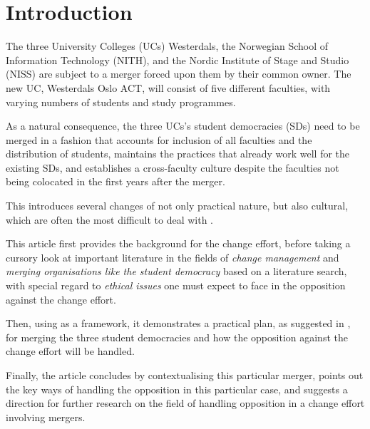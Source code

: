 \section{Introduction}

The three University Colleges (UCs) Westerdals, the Norwegian School of Information Technology (NITH), and the Nordic Institute of Stage and Studio (NISS) are subject to a merger forced upon them by their common owner. The new UC, Westerdals Oslo ACT, will consist of five different faculties, with varying numbers of students and study programmes.

As a natural consequence, the three UCs's student democracies (SDs) need to be merged in a fashion that accounts for inclusion of all faculties and the distribution of students, maintains the practices that already work well for the existing SDs, and establishes a cross-faculty culture despite the faculties not being colocated in the first years after the merger.

This introduces several changes of not only practical nature, but also cultural, which are often the most difficult to deal with \autocite[12495]{luftman:managing-the-information-technology-resource:2009}.

This article first provides the background for the change effort, before taking a cursory look at important literature in the fields of \textit{change management} and \textit{merging organisations like the student democracy} based on a literature search, with special regard to \textit{ethical issues} one must expect to face in the opposition against the change effort.

Then, using \autocite{kotter:leading-change-why-transformation-efforts-fail:1995} as a framework, it demonstrates a practical plan, as suggested in \autocite{pettigrew-woodman-cameron:studying-organizational-change-and-development:2001}, for merging the three student democracies and how the opposition against the change effort will be handled.

Finally, the article concludes by contextualising this particular merger, points out the key ways of handling the opposition in this particular case, and suggests a direction for further research on the field of handling opposition in a change effort involving mergers.
